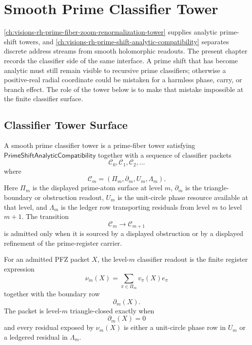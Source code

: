 \chapter{Smooth Prime Classifier Tower}
\label{ch:visions-rh-smooth-prime-classifier-tower}

\autoref{ch:visions-rh-prime-fiber-zoom-renormalization-tower}
supplies analytic prime-shift towers, and
\autoref{ch:visions-rh-prime-shift-analytic-compatibility} separates
discrete address streams from smooth holomorphic readouts.  The present
chapter records the classifier side of the same interface.  A prime
shift that has become analytic must still remain visible to recursive
prime classifiers; otherwise a positive-real radial coordinate could be
mistaken for a harmless phase, carry, or branch effect.  The role of the
tower below is to make that mistake impossible at the finite classifier
surface.

\section{Classifier Tower Surface}
\label{sec:rh-smooth-prime-classifier-tower-surface}

\begin{definition}[SmoothPrimeClassifierTower]
\label{def:rh-smooth-prime-classifier-tower}
A smooth prime classifier tower is a prime-fiber tower satisfying
$\mathsf{PrimeShiftAnalyticCompatibility}$ together with a sequence of
classifier packets
$$
\mathcal C_0,\mathcal C_1,\mathcal C_2,\ldots
$$
where
$$
\mathcal C_m=(\Pi_m,\partial_m,U_m,\Lambda_m).
$$
Here $\Pi_m$ is the displayed prime-atom surface at level $m$,
$\partial_m$ is the triangle-boundary or obstruction readout, $U_m$ is
the unit-circle phase resource available at that level, and
$\Lambda_m$ is the ledger row transporting residuals from level $m$ to
level $m+1$.  The transition
$$
\mathcal C_m\to\mathcal C_{m+1}
$$
is admitted only when it is sourced by a displayed obstruction or by a
displayed refinement of the prime-register carrier.
\end{definition}

\begin{definition}
\label{def:rh-smooth-prime-classifier-readout}
For an admitted PFZ packet $X$, the level-$m$ classifier readout is the
finite register expression
$$
\nu_m(X)=\sum_{\pi\in\Pi_m}v_{\pi}(X)e_{\pi}
$$
together with the boundary row
$$
\partial_m(X).
$$
The packet is level-$m$ triangle-closed exactly when
$$
\partial_m(X)=0
$$
and every residual exposed by $\nu_m(X)$ is either a unit-circle phase
row in $U_m$ or a ledgered residual in $\Lambda_m$.
\end{definition}

